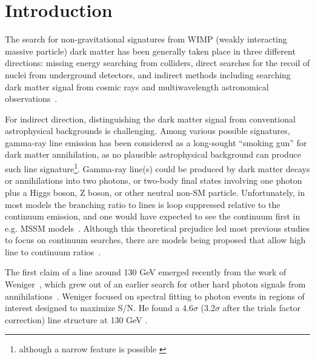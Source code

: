 \documentclass[aps,twocolumn,prd,superscriptaddress,showpacs,nofootinbib,fixfloat]{revtex4}
\begin{document}
\maketitle




\section{Introduction}


The search for non-gravitational signatures from WIMP (weakly interacting
massive particle) dark matter
has been generally taken place in three different
directions: missing energy searching from colliders, direct
searches for the recoil of nuclei from underground detectors,
and indirect methods including searching dark matter signal
from cosmic rays and multiwavelength astronomical
observations~\citep{Jungman:1995df,Bergstrom:2000,Bertone:2005,Hooper:2007Review, 2012arXiv1205.4882B}.

For indirect direction, distinguishing the dark matter
signal from conventional astrophysical backgrounds is challenging.
Among various possible signatures, gamma-ray line
emission has been considered as a long-sought ``smoking
gun'' for dark matter annihilation, as no plausible
astrophysical background can produce such line
signature\footnote{although a narrow feature is possible
  \citep[see][]{2012arXiv1207.0458A}}. 
Gamma-ray line(s) could be produced by dark matter
decays or annihilations into two photons, or two-body final
states involving one photon plus a Higgs boson, Z boson, or
other neutral non-SM particle. Unfortunately, in most models the
branching ratio to lines is loop suppressed relative to the
continuum emission, and one would have expected to see the
continuum first in e.g. MSSM
models~\citep[e.g.][]{Bergstrom:1997}.  Although this
theoretical prejudice led most previous studies to focus on
continuum searches, there are models being proposed that
allow high line to continuum
ratios~\citep[e.g.][]{Bergstrom:1998, Bergstrom:2000,
  Bertone:2009, Jackson:2010, Cline:2012, Weiner:2012}.

The first claim of a line around 130 GeV emerged recently
from the work of Weniger~\citep{Weniger:2012}, which grew out of an
earlier search for other hard photon signals from
annihilations~\citep{Bringmann:2012}.  Weniger focused on
spectral fitting to photon events in regions of interest
designed to maximize S/N.  He found a 4.6$\sigma$
(3.2$\sigma$ after the trials factor correction) line
structure at 130 GeV .
\end{document}
